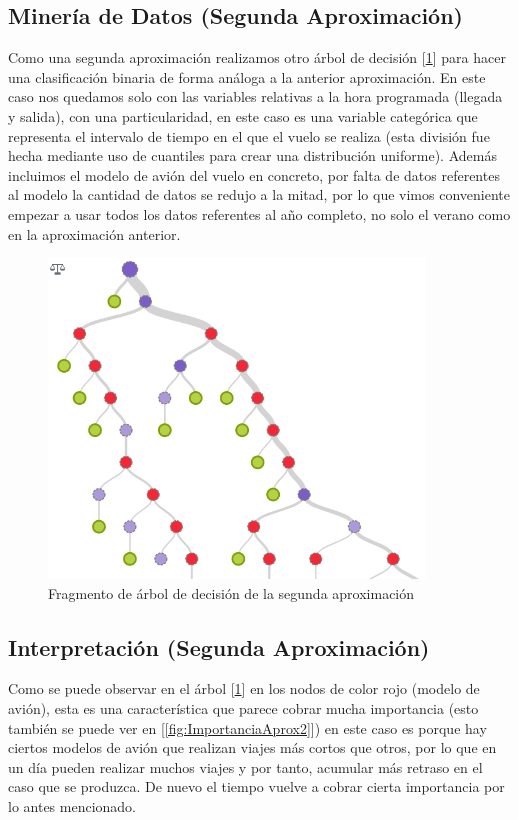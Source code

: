 \documentclass[format=acmsmall, review=false, screen=true]{acmart}
\begin{document}
\subsection{Minería de Datos (Segunda Aproximación)}

Como una segunda aproximación realizamos otro árbol de decisión [\ref{fig:ArbAprox2}] para hacer una clasificación binaria de forma análoga a la anterior aproximación. En este caso nos quedamos solo con las variables relativas a la hora programada (llegada y salida), con una particularidad, en este caso es una variable categórica que representa el intervalo de tiempo en el que el vuelo se realiza (esta división fue hecha mediante uso de cuantiles para crear una distribución uniforme). Además incluimos el modelo de avión del vuelo en concreto, por falta de datos referentes al modelo la cantidad de datos se redujo a la mitad, por lo que vimos conveniente empezar a usar todos los datos referentes al año completo, no solo el verano como en la aproximación anterior.

\begin{figure}[htb]
	\centering
	\includegraphics[width=10cm]{ArbAprox2.png}
	\caption{Fragmento de árbol de decisión de la segunda aproximación}
	\label{fig:ArbAprox2}
\end{figure}

\subsection{Interpretación (Segunda Aproximación)}
Como se puede observar en el árbol [\ref{fig:ArbAprox2}] en los nodos de color rojo (modelo de avión), esta es una característica que parece cobrar mucha importancia (esto también se puede ver en [\ref{fig:ImportanciaAprox2}]) en este caso es porque hay ciertos modelos de avión que realizan viajes más cortos que otros, por lo que en un día pueden realizar muchos viajes y por tanto, acumular más retraso en el caso que se produzca. De nuevo el tiempo vuelve a cobrar cierta importancia por lo antes mencionado.
\end{document}
